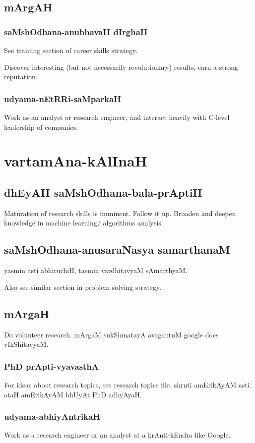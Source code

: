 \documentclass[oneside, article]{memoir}
\begin{document}
\subsection{mArgAH}
\subsubsection{saMshOdhana-anubhavaH dIrghaH}
See training section of career skills strategy.

Discover interesting (but not necessarily revolutionary) results, earn a strong reputation.

\subsubsection{udyama-nEtRRi-saMparkaH}
Work as an analyst or research engineer, and interact heavily with C-level leadership of companies.

\section{vartamAna-kAlInaH}
\subsection{dhEyAH saMshOdhana-bala-prAptiH}
Maturation of research skills is imminent. Follow it up. Broaden and deepen knowledge in machine learning/ algorithms analysis.

\subsection{saMshOdhana-anusaraNasya samarthanaM}
yasmin asti abhiruchiH, tasmin vardhitavyaM sAmarthyaM.

Also see similar section in problem solving strategy.

\subsection{mArgaH}
Do volunteer research. mArgaM sukShmatayA avagantuM google docs vIkShitavyaM.

\subsubsection{PhD prApti-vyavasthA}
For ideas about research topics, see research topics file. shruti amErikAyAM asti. ataH amErikAyAM bhUyAt PhD adhyAyaH.

\subsubsection{udyama-abhiyAntrikaH}
Work as a research engineer or an analyst at a krAnti-kEndra like Google.
\end{document}
